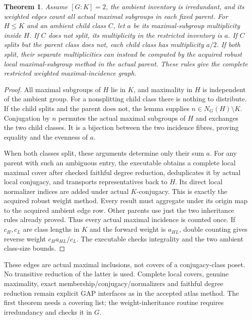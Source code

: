 \documentclass[11pt]{article}
\newtheorem{theorem}{Theorem}\newtheorem{lemma}[theorem]{Lemma}
\begin{document}
\begin{theorem}
Assume $[G:K]=2$, the ambient inventory is irredundant, and its weighted edges
count all actual maximal subgroups in each fixed parent. For $H\le K$ and
an ambient child class $C$, let $a$ be its maximal-subgroup multiplicity
inside $H$.
If $C$ does not split, its multiplicity in the restricted inventory is $a$.
If $C$ splits but the parent class does not, each child class has multiplicity
$a/2$. If both split, their separate multiplicities can instead be computed
by the acquired robust local maximal-subgroup method in the actual parent.
These rules give the complete restricted weighted maximal-incidence graph.
\end{theorem}
\begin{proof}
All maximal subgroups of $H$ lie in $K$, and maximality in $H$ is independent
of the ambient group. For a nonsplitting child class there is nothing to
distribute. If the child splits and the parent does not, the lemma supplies
$n\in N_G(H)\setminus K$. Conjugation by $n$ permutes the actual maximal
subgroups of $H$ and exchanges the two child classes. It is a bijection
between the two incidence fibres, proving equality and the evenness of $a$.

When both classes split, these arguments determine only their sum $a$.
For any parent with such an ambiguous entry, the executable obtains a
complete local maximal cover after checked faithful degree reduction,
deduplicates it by actual local conjugacy, and transports representatives
back to $H$. Its direct local normalizer indices are added under actual
$K$-conjugacy. This is exactly the acquired robust weight method. Every
result must aggregate under its origin map to the acquired ambient edge row.
Other parents use just the two inheritance rules already proved.
Thus every actual maximal incidence is counted once. If $c_H,c_L$ are
class lengths in $K$ and the forward weight is $a_{HL}$, double counting
gives reverse weight $c_Ha_{HL}/c_L$. The executable checks integrality and
the two ambient class-size bounds.
\end{proof}

These edges are actual maximal inclusions, not covers of a conjugacy-class
poset. No transitive reduction of the latter is used. Complete local covers,
genuine maximality, exact membership/conjugacy/normalizers and faithful
degree reduction remain explicit GAP interfaces as in the accepted atlas
method. The first theorem needs a covering list; the weight-inheritance
routine requires irredundancy and checks it in $G$.
\end{document}
